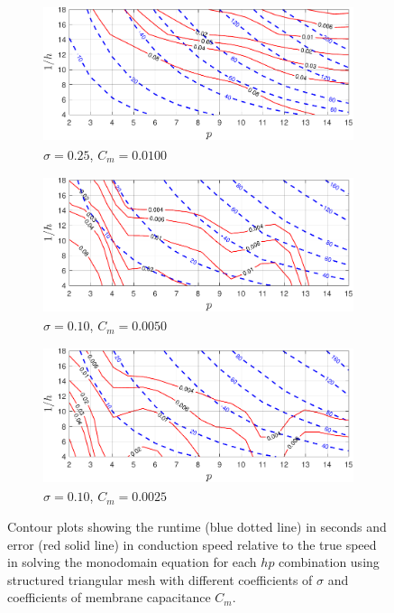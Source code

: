 \begin{figure}[ht!]
    \begin{subfigure}{0.45\textwidth}
        \centering
        \includegraphics[width=\linewidth, height=4cm]{figs/cond0.25.pdf}  
        \caption{$\sigma = 0.25$, $C_m = 0.0100$}
        \label{cond0.25}
    \end{subfigure}
    \begin{subfigure}{0.45\textwidth}
        \centering
        \includegraphics[width=\linewidth, height=4cm]{figs/cm0.0050.pdf} 
        \caption{$\sigma = 0.10$, $C_m = 0.0050$}
        \label{cm0.0050}
    \end{subfigure}
    \begin{subfigure}{0.45\textwidth}
        \centering
        \includegraphics[width=\linewidth, height=4cm]{figs/cm0.0025.pdf}  
        \caption{$\sigma = 0.10$, $C_m = 0.0025$}
        \label{cm0.0025}
    \end{subfigure}
    \caption{Contour plots showing the runtime (blue dotted line) in seconds and error (red solid line) in conduction speed relative to the true speed in solving the monodomain equation for each $hp$ combination using structured triangular mesh with different coefficients of $\sigma$ and coefficients of membrane capacitance $C_m$.}
    \label{coeff}
\end{figure}
